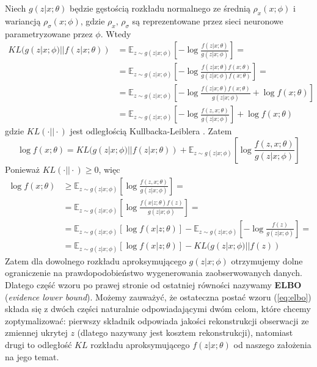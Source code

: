 \documentclass[12pt]{extarticle}
\begin{document}
Niech $g(z|x; \theta)$ będzie gęstością
rozkładu normalnego ze średnią $\rho_x(x; \phi)$ i wariancją $\rho_{\sigma}(x; \phi)$,
gdzie $\rho_x,\,\rho_{\sigma}$ są reprezentowane przez sieci neuronowe
parametryzowane przez $\phi$. Wtedy
\begin{equation}
\begin{split}
KL(g(z|x;\phi) || f(z|x;\theta)) &= \mathbb{E}_{z\sim g(z|x;\phi)}\left[
-\log\frac{f(z|x;\theta)}{g(z|x;\phi)}\right]= \\
&=\mathbb{E}_{z\sim g(z|x;\phi)}\left[-\log\frac{f(z|x;\theta)f(x;\theta)}{g(z|x;\phi)f(x;\theta)}\right]= \\
&=\mathbb{E}_{z\sim g(z|x;\phi)}\left[-\log\frac{f(z|x;\theta)f(x;\theta)}{g(z|x;\phi)}+\log f(x;\theta)\right] \\
&=\mathbb{E}_{z\sim g(z|x;\phi)}\left[-\log\frac{f(z,x;\theta)}{g(z|x;\phi)}\right] +\log f(x;\theta)
\end{split}
\end{equation}
gdzie $KL(\cdotp || \cdotp)$ jest odległością Kullbacka-Leiblera \cite{kl-cost}.
Zatem
\begin{equation}
\log f(x;\theta) = KL(g(z|x;\phi) || f(z|x;\theta)) + \mathbb{E}_{z\sim g(z|x;\phi)}\left[\log\frac{f(z,x;\theta)}{g(z|x;\phi)}\right]
\end{equation}
Ponieważ $KL(\cdotp || \cdotp) \geq 0$, więc
\begin{equation}
\begin{split}
\log f(x;\theta)  &\geq \mathbb{E}_{z\sim g(z|x;\phi)}\left[\log\frac{f(z,x;\theta)}{g(z|x;\phi)}\right] = \\
&= \mathbb{E}_{z\sim g(z|x;\phi)}\left[\log\frac{f(x|z;\theta)f(z)}{g(z|x;\phi)}\right] = \\
&=\mathbb{E}_{z\sim g(z|x;\phi)}\left[\log f(x|z;\theta)\right] - \mathbb{E}_{z\sim g(z|x;\phi)}\left[-\log\frac{f(z)}{g(z|x;\phi)}\right] =\\
&=\mathbb{E}_{z\sim g(z|x;\phi)}\left[\log f(x|z;\theta)\right] - KL(g(z|x;\phi) || f(z))
\end{split}
\label{eq:elbo}
\end{equation}
Zatem dla dowolnego rozkładu aproksymującego $g(z|x;\phi)$ otrzymujemy dolne
ograniczenie na prawdopodobieństwo wygenerowania zaobserwowanych danych.
Dlatego część wzoru po prawej stronie od ostatniej równości
nazywamy \textbf{ELBO} (\textit{evidence lower bound}). Możemy zauważyć, że ostateczna
postać wzoru (\ref{eq:elbo}) składa się z dwóch części naturalnie odpowiadającymi dwóm
celom, które chcemy zoptymalizować: pierwszy składnik odpowiada
jakości rekonstrukcji obserwacji ze zmiennej ukrytej $z$
(dlatego nazywany jest kosztem rekonstrukcji),
natomiast drugi to odległość $KL$ rozkładu aproksymującego
$f(z|x;\theta)$ od naszego założenia na jego temat.
\end{document}
